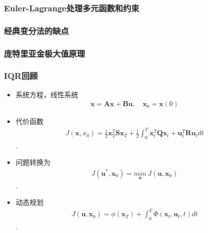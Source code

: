 \documentclass[UTF8, aspectratio=169, 10pt]{ctexbeamer}
\begin{document}
\begin{frame}
  \frametitle{Euler-Lagrange处理多元函数和约束}

\end{frame}

\begin{frame}
  \frametitle{经典变分法的缺点}

\end{frame}

\begin{frame}
  \frametitle{庞特里亚金极大值原理}
\end{frame}

\begin{frame}
  \frametitle{IQR回顾}

  \begin{itemize}
  \item 系统方程，线性系统
    \begin{align}
      \dot{ \boldsymbol{ x } } = \boldsymbol{ A x } + \boldsymbol{ B u }, \quad
      \boldsymbol{x}_0 = \boldsymbol{x}(0)
    \end{align}

  \item 代价函数
    \begin{align}
      J(\boldsymbol{x}, x_0) = \frac{1}{2} \boldsymbol{x}^T_T \boldsymbol{S}
      \boldsymbol{ x }_T + \frac{1}{2} \int_0^T \boldsymbol{x}^T_t
      \boldsymbol{Q} \boldsymbol{x}_t + \boldsymbol{u}^T_t \boldsymbol{R}
      \boldsymbol{u}_t dt
    \end{align}.

  \item 问题转换为
    \begin{align}
      J( \boldsymbol{u}^{*}, \boldsymbol{x}_0 ) = \underset{ \boldsymbol{u}
      }{min}  \, J(
      \boldsymbol{u}, \boldsymbol{x}_0 )
    \end{align}.

  \item 动态规划
    \begin{align}
       J( \boldsymbol{u}, \boldsymbol{x}_0 ) = \phi( \boldsymbol{x}_{T} ) + \int_0^T
      \Phi( \boldsymbol{x}_t,  \boldsymbol{u}_t, t ) dt
    \end{align}.

  \end{itemize}
\end{frame}
\end{document}
